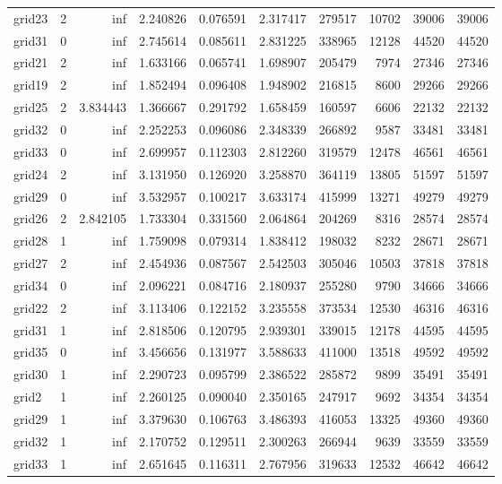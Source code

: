 \documentclass[../../../thesis.tex]{subfiles}
\begin{document}
\begin{longtable}{|l|r|r|r|r|r|r|r|r|r|}
grid23 & 2 & inf & 2.240826 & 0.076591 & 2.317417 & 279517 & 10702 & 39006 & 39006 \\
grid31 & 0 & inf & 2.745614 & 0.085611 & 2.831225 & 338965 & 12128 & 44520 & 44520 \\
grid21 & 2 & inf & 1.633166 & 0.065741 & 1.698907 & 205479 & 7974 & 27346 & 27346 \\
grid19 & 2 & inf & 1.852494 & 0.096408 & 1.948902 & 216815 & 8600 & 29266 & 29266 \\
grid25 & 2 & 3.834443 & 1.366667 & 0.291792 & 1.658459 & 160597 & 6606 & 22132 & 22132 \\
grid32 & 0 & inf & 2.252253 & 0.096086 & 2.348339 & 266892 & 9587 & 33481 & 33481 \\
grid33 & 0 & inf & 2.699957 & 0.112303 & 2.812260 & 319579 & 12478 & 46561 & 46561 \\
grid24 & 2 & inf & 3.131950 & 0.126920 & 3.258870 & 364119 & 13805 & 51597 & 51597 \\
grid29 & 0 & inf & 3.532957 & 0.100217 & 3.633174 & 415999 & 13271 & 49279 & 49279 \\
grid26 & 2 & 2.842105 & 1.733304 & 0.331560 & 2.064864 & 204269 & 8316 & 28574 & 28574 \\
grid28 & 1 & inf & 1.759098 & 0.079314 & 1.838412 & 198032 & 8232 & 28671 & 28671 \\
grid27 & 2 & inf & 2.454936 & 0.087567 & 2.542503 & 305046 & 10503 & 37818 & 37818 \\
grid34 & 0 & inf & 2.096221 & 0.084716 & 2.180937 & 255280 & 9790 & 34666 & 34666 \\
grid22 & 2 & inf & 3.113406 & 0.122152 & 3.235558 & 373534 & 12530 & 46316 & 46316 \\
grid31 & 1 & inf & 2.818506 & 0.120795 & 2.939301 & 339015 & 12178 & 44595 & 44595 \\
grid35 & 0 & inf & 3.456656 & 0.131977 & 3.588633 & 411000 & 13518 & 49592 & 49592 \\
grid30 & 1 & inf & 2.290723 & 0.095799 & 2.386522 & 285872 & 9899 & 35491 & 35491 \\
grid2 & 1 & inf & 2.260125 & 0.090040 & 2.350165 & 247917 & 9692 & 34354 & 34354 \\
grid29 & 1 & inf & 3.379630 & 0.106763 & 3.486393 & 416053 & 13325 & 49360 & 49360 \\
grid32 & 1 & inf & 2.170752 & 0.129511 & 2.300263 & 266944 & 9639 & 33559 & 33559 \\
grid33 & 1 & inf & 2.651645 & 0.116311 & 2.767956 & 319633 & 12532 & 46642 & 46642 \\

\end{longtable}
\end{document}
